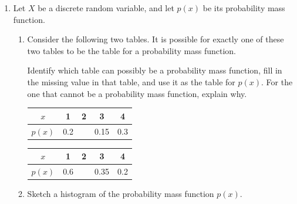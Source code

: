 \documentclass[11pt]{article}
\begin{document}
\begin{enumerate}

\newpage


\item Let $X$ be a discrete random variable, and let $p(x)$ be its probability mass function.

\begin{enumerate}
    \item Consider the following two tables. It is possible for exactly one of these two tables to be the table for a probability mass function.

    Identify which table can possibly be a probability mass function, fill in the missing value in that table, and use it as the table for $p(x)$. For the one that cannot be a probability mass function, explain why. 

    \vspace{1cm}

    \begin{minipage}{0.45\textwidth}
        \centering    
        \begin{tabular}{c|cccc}
            \hline
           $x$  & 1 & 2 & 3 & 4 \\
           \hline
           $p(x)$  & 0.2 &  & 0.15 & 0.3\\
           \hline
        \end{tabular}
    \end{minipage}
    \begin{minipage}{0.45\textwidth}
        \centering
        \begin{tabular}{c|cccc}
            \hline
           $x$  & 1 & 2 & 3 & 4 \\
           \hline
           $p(x)$  & 0.6 &  & 0.35 & 0.2\\
           \hline
        \end{tabular}
    \end{minipage}

    \vspace{3cm}

    \item Sketch a histogram of the probability mass function $p(x)$.


\end{enumerate}
\end{enumerate}
\end{document}
